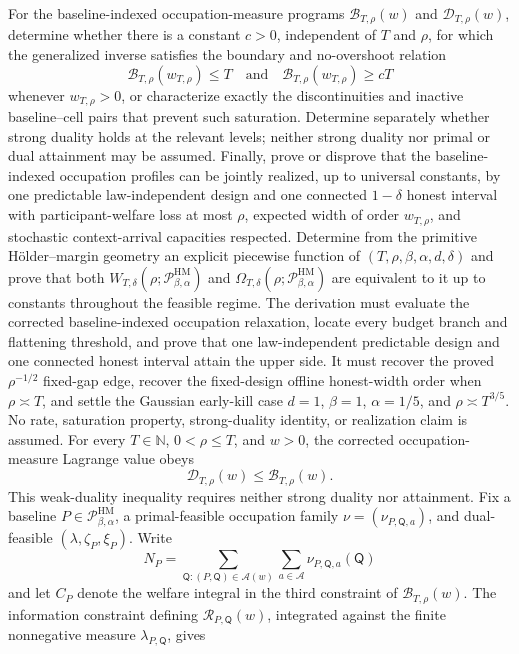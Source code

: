 For the baseline-indexed occupation-measure programs \(\mathcal B_{T,\rho}(w)\) and \(\mathcal D_{T,\rho}(w)\), determine whether there is a constant \(c>0\), independent of \(T\) and \(\rho\), for which the generalized inverse satisfies the boundary and no-overshoot relation
\[
\mathcal B_{T,\rho}(w_{T,\rho})\le T
\quad\text{and}\quad
\mathcal B_{T,\rho}(w_{T,\rho})\ge cT
\]
whenever \(w_{T,\rho}>0\), or characterize exactly the discontinuities and inactive baseline--cell pairs that prevent such saturation.  Determine separately whether strong duality holds at the relevant levels; neither strong duality nor primal or dual attainment may be assumed.  Finally, prove or disprove that the baseline-indexed occupation profiles can be jointly realized, up to universal constants, by one predictable law-independent design and one connected \(1-\delta\) honest interval with participant-welfare loss at most \(\rho\), expected width of order \(w_{T,\rho}\), and stochastic context-arrival capacities respected.
Determine from the primitive H\"older--margin geometry an explicit piecewise function of \((T,\rho,\beta,\alpha,d,\delta)\) and prove that both \(W_{T,\delta}(\rho;\mathcal P_{\beta,\alpha}^{\mathrm{HM}})\) and \(\Omega_{T,\delta}(\rho;\mathcal P_{\beta,\alpha}^{\mathrm{HM}})\) are equivalent to it up to constants throughout the feasible regime.  The derivation must evaluate the corrected baseline-indexed occupation relaxation, locate every budget branch and flattening threshold, and prove that one law-independent predictable design and one connected honest interval attain the upper side.  It must recover the proved \(\rho^{-1/2}\) fixed-gap edge, recover the fixed-design offline honest-width order when \(\rho\asymp T\), and settle the Gaussian early-kill case \(d=1\), \(\beta=1\), \(\alpha=1/5\), and \(\rho\asymp T^{3/5}\).  No rate, saturation property, strong-duality identity, or realization claim is assumed.
For every \(T\in\mathbb N\), \(0<\rho\le T\), and \(w>0\), the corrected occupation-measure Lagrange value obeys
\[
\mathcal D_{T,\rho}(w)\le\mathcal B_{T,\rho}(w).
\]
This weak-duality inequality requires neither strong duality nor attainment.
Fix a baseline \(P\in\mathcal P_{\beta,\alpha}^{\mathrm{HM}}\), a primal-feasible occupation family \(\nu=(\nu_{P,\mathsf Q,a})\), and dual-feasible \((\lambda,\zeta_P,\xi_P)\).  Write
\[
N_P=\sum_{\mathsf Q:(P,\mathsf Q)\in\mathscr A(w)}
\sum_{a\in\mathcal A}\nu_{P,\mathsf Q,a}(\mathsf Q)
\]
and let \(C_P\) denote the welfare integral in the third constraint of \(\mathcal B_{T,\rho}(w)\).  The information constraint defining \(\mathcal R_{P,\mathsf Q}(w)\), integrated against the finite nonnegative measure \(\lambda_{P,\mathsf Q}\), gives
